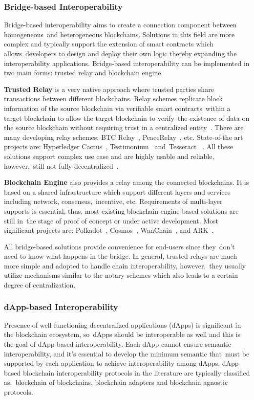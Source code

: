 \subsubsection{Bridge-based Interoperability}
Bridge-based interoperability aims to create a connection component between homogeneous\
and heterogeneous blockchains.
Solutions in this field are more complex and typically support the extension of smart contracts which allows\
developers to design and deploy their own logic thereby expanding the interoperability applications.
Bridge-based interoperability can be implemented in two main forms: trusted relay and blockchain engine.

\textbf{Trusted Relay} is a very native approach where trusted parties share transactions between different blockchains.
Relay schemes replicate block information of the source blockchain via verifiable smart contracts\
within a target blockchain to allow the target blockchain to verify\
the existence of data on the source blockchain without requiring trust in a centralized entity~\cite{buterin2016}.
There are many developing relay schemes: BTC Relay~\cite{Chow2016}, PeaceRelay~\cite{Luu2019}, etc.
State-of-the art projects are: Hyperledger Cactus~\cite{Hyperledger2020}, Testimonium~\cite{Frauenthaler2020} and\
Tesseract ~\cite{cryptoeprint:2017/1153}.
All these solutions support complex use case and are highly usable and reliable, however,\
still not fully decentralized~\cite{cryptoeprint:2021/537}.

\textbf{Blockchain Engine} also provides a relay among the connected blockchains.
It is based on a shared infrastructure which support different layers and services including network, consensus,\
incentive, etc.
Requirements of multi-layer supports is essential, thus, most existing blockchain engine-based solutions are still in\
the stage of proof of concept or under active development.
Most significant projects are: Polkadot~\cite{cryptoeprint:2020/641}, Cosmos~\cite{Kwon2019},
WanChain~\cite{Wanchain}, and ARK~\cite{ARK}.

All bridge-based solutions provide convenience for end-users since they\
don't need to know what happens in the bridge.
In general, trusted relays are much more simple and adopted to handle chain interoperability, however,\
they usually utilize mechanisms similar to the notary schemes which also leads to a certain degree of centralization.

\subsubsection{dApp-based Interoperability}
Presence of well functioning decentralized applications (dApps) is significant in the blockchain ecosystem, so\
dApps should be interoperable as well and this is the goal of dApp-based interoperability.
Each dApp cannot ensure semantic interoperability, and it's essential to develop the minimum semantic that\
must be supported by each application to achieve interoperability among dApps.
dApp-based blockchain interoperability protocols in the literature are typically classified as:\
blockchain of blockchains, blockchain adapters and blockchain agnostic protocols.


